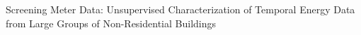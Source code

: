 Screening Meter Data: Unsupervised Characterization of Temporal Energy Data from Large Groups of Non-Residential Buildings